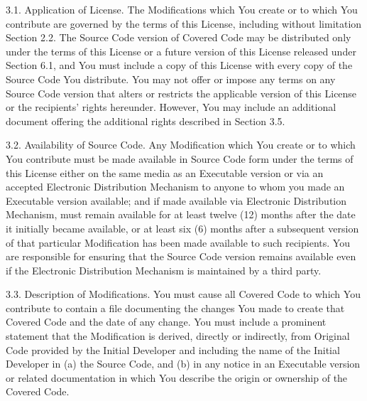\begin{DoxyCode}
     3.1. Application of License.
     The Modifications which You create or to which You contribute are
     governed by the terms of this License, including without limitation
     Section 2.2. The Source Code version of Covered Code may be
     distributed only under the terms of this License or a future version
     of this License released under Section 6.1, and You must include a
     copy of this License with every copy of the Source Code You
     distribute. You may not offer or impose any terms on any Source Code
     version that alters or restricts the applicable version of this
     License or the recipients' rights hereunder. However, You may include
     an additional document offering the additional rights described in
     Section 3.5.

     3.2. Availability of Source Code.
     Any Modification which You create or to which You contribute must be
     made available in Source Code form under the terms of this License
     either on the same media as an Executable version or via an accepted
     Electronic Distribution Mechanism to anyone to whom you made an
     Executable version available; and if made available via Electronic
     Distribution Mechanism, must remain available for at least twelve (12)
     months after the date it initially became available, or at least six
     (6) months after a subsequent version of that particular Modification
     has been made available to such recipients. You are responsible for
     ensuring that the Source Code version remains available even if the
     Electronic Distribution Mechanism is maintained by a third party.

     3.3. Description of Modifications.
     You must cause all Covered Code to which You contribute to contain a
     file documenting the changes You made to create that Covered Code and
     the date of any change. You must include a prominent statement that
     the Modification is derived, directly or indirectly, from Original
     Code provided by the Initial Developer and including the name of the
     Initial Developer in (a) the Source Code, and (b) in any notice in an
     Executable version or related documentation in which You describe the
     origin or ownership of the Covered Code.


\end{DoxyCode}
